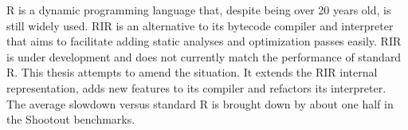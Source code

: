 R is a dynamic programming language that, despite being over 20 years old, is still widely used. RIR is an alternative to its bytecode compiler and interpreter that aims to facilitate adding static analyses and optimization passes easily. RIR is under development and does not currently match the performance of standard R. This thesis attempts to amend the situation. It extends the RIR internal representation, adds new features to its compiler and refactors its interpreter. The average slowdown versus standard R is brought down by about one half in the Shootout benchmarks.
